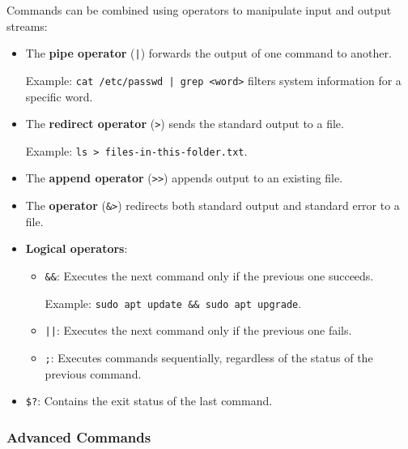 Commands can be combined using operators to manipulate input and output streams:
\begin{itemize}
    \item The \textbf{pipe operator} (\texttt{|}) forwards the output of one command to another.
    
    Example: \texttt{cat /etc/passwd | grep <word>} filters system information for a specific word.
    
    \item The \textbf{redirect operator} (\texttt{>}) sends the standard output to a file.
    
    Example: \texttt{ls > files-in-this-folder.txt}.
    
    \item The \textbf{append operator} (\texttt{>>}) appends output to an existing file.
    \item The \textbf{operator} (\texttt{\&>}) redirects both standard output and standard error to a file.
    \item \textbf{Logical operators}:
    \begin{itemize}
        \item \texttt{\&\&}: Executes the next command only if the previous one succeeds.
        
        Example: \texttt{sudo apt update \&\& sudo apt upgrade}.
        
        \item \texttt{||}: Executes the next command only if the previous one fails.
        \item \texttt{;}: Executes commands sequentially, regardless of the status of the previous command.
    \end{itemize}
    \item \texttt{\$?}: Contains the exit status of the last command.
\end{itemize}

\subsubsection{Advanced Commands}


